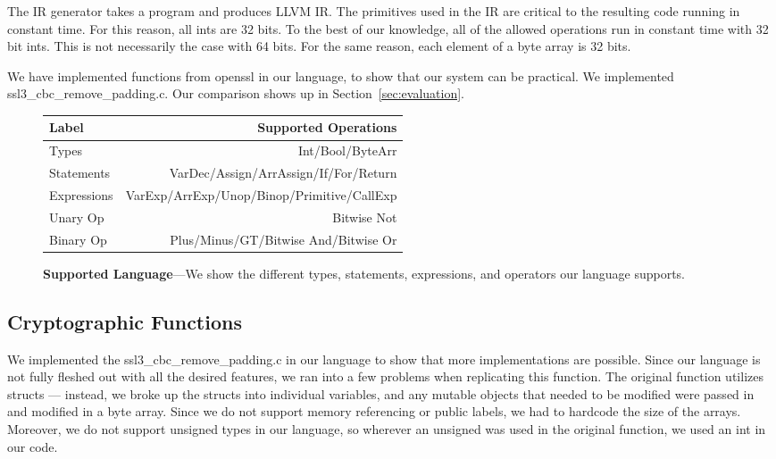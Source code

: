  The IR generator takes a \ccore program and produces LLVM IR. The primitives used in the IR are critical to the resulting code running in constant time. For this reason, all ints are 32 bits. To the best of our knowledge, all of the allowed operations run in constant time with 32 bit ints. This is not necessarily the case with 64 bits. For the same reason, each element of a byte array is 32 bits.

We have implemented functions from openssl in our language, to show that our
system can be practical. We implemented ssl3\_cbc\_remove\_padding.c. Our
comparison shows up in Section~\ref{sec:evaluation}.

\begin{figure}
        \centering
        \small
        \begin{tabularx}{\columnwidth}{lr}
        \toprule
        Label & Supported Operations\\
        \midrule
        Types &  Int/Bool/ByteArr \\
        Statements & VarDec/Assign/ArrAssign/If/For/Return \\
        Expressions & VarExp/ArrExp/Unop/Binop/Primitive/CallExp \\
        Unary Op &  Bitwise Not \\
        Binary Op & Plus/Minus/GT/Bitwise And/Bitwise Or \\
        \bottomrule
        \end{tabularx}
        \caption{\textbf{Supported Language}---We show the different types,
        statements, expressions, and operators our language supports.}
    \label{table:functions}
\end{figure}

\subsection{Cryptographic Functions}

 We implemented the ssl3\_cbc\_remove\_padding.c in our language to show that more implementations are possible. Since our language is not fully fleshed out with all the desired features, we ran into a few problems when replicating this function. The original function utilizes structs --- instead, we broke up the structs into individual variables, and any mutable objects that needed to be modified were passed in and modified in a byte array. Since we do not support memory referencing or public labels, we had to hardcode the size of the arrays. Moreover, we do not support unsigned types in our language, so wherever an unsigned was used in the original function, we used an int in our code.

